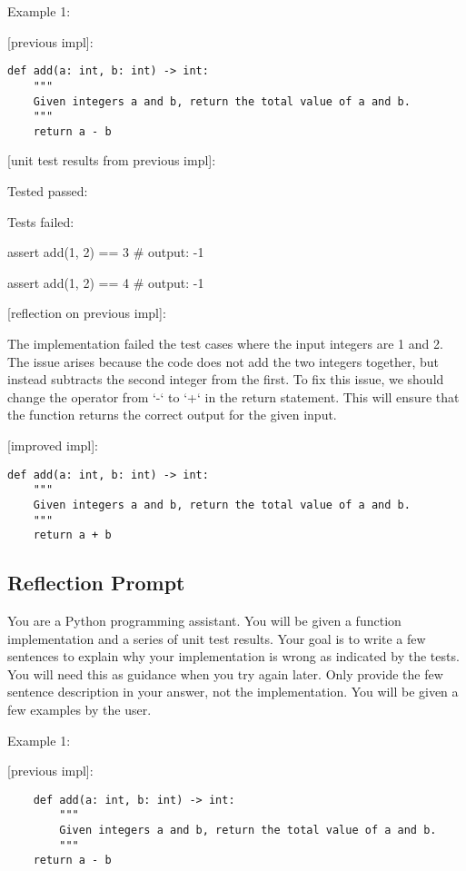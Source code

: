 \documentclass{article} \usepackage{iclr2024_conference,times}
\begin{document}
Example 1:

[previous impl]:

\begin{lstlisting}
def add(a: int, b: int) -> int:
    """
    Given integers a and b, return the total value of a and b.
    """
    return a - b
\end{lstlisting}

[unit test results from previous impl]:

Tested passed:

Tests failed:

assert add(1, 2) == 3 \# output: -1

assert add(1, 2) == 4 \# output: -1

[reflection on previous impl]:

The implementation failed the test cases where the input integers are 1 and 2. The issue arises because the code does not add the two integers together, but instead subtracts the second integer from the first. To fix this issue, we should change the operator from `-` to `+` in the return statement. This will ensure that the function returns the correct output for the given input.

[improved impl]:

\begin{lstlisting}
def add(a: int, b: int) -> int:
    """
    Given integers a and b, return the total value of a and b.
    """
    return a + b
\end{lstlisting}

\subsection{Reflection Prompt}

You are a Python programming assistant. You will be given a function implementation and a series of unit test results. Your goal is to write a few sentences to explain why your implementation is wrong as indicated by the tests. You will need this as guidance when you try again later. Only provide the few sentence description in your answer, not the implementation. You will be given a few examples by the user.

Example 1:

[previous impl]:

\begin{lstlisting}
    def add(a: int, b: int) -> int:
        """
        Given integers a and b, return the total value of a and b.
        """
    return a - b
\end{lstlisting}
\end{document}
